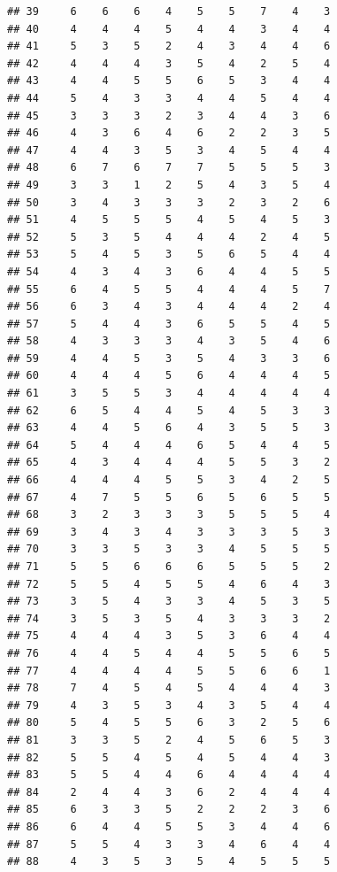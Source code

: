 \documentclass[
]{article}
\begin{document}
\begin{verbatim}
## 39     6    6    6    4    5    5    7    4    3
## 40     4    4    4    5    4    4    3    4    4
## 41     5    3    5    2    4    3    4    4    6
## 42     4    4    4    3    5    4    2    5    4
## 43     4    4    5    5    6    5    3    4    4
## 44     5    4    3    3    4    4    5    4    4
## 45     3    3    3    2    3    4    4    3    6
## 46     4    3    6    4    6    2    2    3    5
## 47     4    4    3    5    3    4    5    4    4
## 48     6    7    6    7    7    5    5    5    3
## 49     3    3    1    2    5    4    3    5    4
## 50     3    4    3    3    3    2    3    2    6
## 51     4    5    5    5    4    5    4    5    3
## 52     5    3    5    4    4    4    2    4    5
## 53     5    4    5    3    5    6    5    4    4
## 54     4    3    4    3    6    4    4    5    5
## 55     6    4    5    5    4    4    4    5    7
## 56     6    3    4    3    4    4    4    2    4
## 57     5    4    4    3    6    5    5    4    5
## 58     4    3    3    3    4    3    5    4    6
## 59     4    4    5    3    5    4    3    3    6
## 60     4    4    4    5    6    4    4    4    5
## 61     3    5    5    3    4    4    4    4    4
## 62     6    5    4    4    5    4    5    3    3
## 63     4    4    5    6    4    3    5    5    3
## 64     5    4    4    4    6    5    4    4    5
## 65     4    3    4    4    4    5    5    3    2
## 66     4    4    4    5    5    3    4    2    5
## 67     4    7    5    5    6    5    6    5    5
## 68     3    2    3    3    3    5    5    5    4
## 69     3    4    3    4    3    3    3    5    3
## 70     3    3    5    3    3    4    5    5    5
## 71     5    5    6    6    6    5    5    5    2
## 72     5    5    4    5    5    4    6    4    3
## 73     3    5    4    3    3    4    5    3    5
## 74     3    5    3    5    4    3    3    3    2
## 75     4    4    4    3    5    3    6    4    4
## 76     4    4    5    4    4    5    5    6    5
## 77     4    4    4    4    5    5    6    6    1
## 78     7    4    5    4    5    4    4    4    3
## 79     4    3    5    3    4    3    5    4    4
## 80     5    4    5    5    6    3    2    5    6
## 81     3    3    5    2    4    5    6    5    3
## 82     5    5    4    5    4    5    4    4    3
## 83     5    5    4    4    6    4    4    4    4
## 84     2    4    4    3    6    2    4    4    4
## 85     6    3    3    5    2    2    2    3    6
## 86     6    4    4    5    5    3    4    4    6
## 87     5    5    4    3    3    4    6    4    4
## 88     4    3    5    3    5    4    5    5    5

\end{verbatim}
\end{document}
